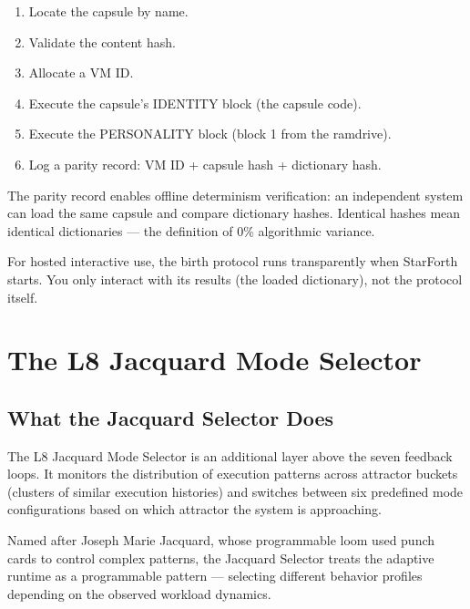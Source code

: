 \begin{enumerate}
  \item Locate the capsule by name.
  \item Validate the content hash.
  \item Allocate a VM ID.
  \item Execute the capsule's IDENTITY block (the capsule code).
  \item Execute the PERSONALITY block (block 1 from the ramdrive).
  \item Log a parity record: VM ID + capsule hash + dictionary hash.
\end{enumerate}

The parity record enables offline determinism verification: an independent
system can load the same capsule and compare dictionary hashes. Identical
hashes mean identical dictionaries --- the definition of 0\% algorithmic
variance.

For hosted interactive use, the birth protocol runs transparently when
StarForth starts. You only interact with its results (the loaded dictionary),
not the protocol itself.

\chapter{The L8 Jacquard Mode Selector}
\label{chap:jacquard}

\section{What the Jacquard Selector Does}
\label{sec:jacquard-what}

The L8 Jacquard Mode Selector is an additional layer above the seven feedback
loops. It monitors the distribution of execution patterns across attractor
buckets (clusters of similar execution histories) and switches between six
predefined mode configurations based on which attractor the system is
approaching.

Named after Joseph Marie Jacquard, whose programmable loom used punch cards to
control complex patterns, the Jacquard Selector treats the adaptive runtime
as a programmable pattern --- selecting different behavior profiles depending
on the observed workload dynamics.


